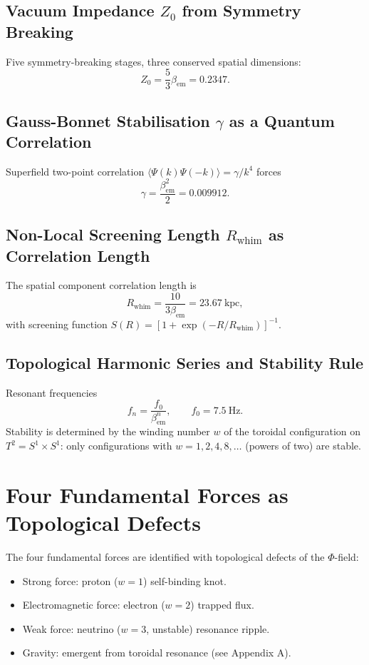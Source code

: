 \documentclass[12pt, a4paper]{article}
\begin{document}
\subsection{Vacuum Impedance $Z_{0}$ from Symmetry Breaking}
Five symmetry-breaking stages, three conserved spatial dimensions:
\begin{equation}
Z_{0} = \frac{5}{3}\beta_{\mathrm{em}} = 0.2347.
\end{equation}

\subsection{Gauss-Bonnet Stabilisation $\gamma$ as a Quantum Correlation}
Superfield two-point correlation $\langle \Psi (k)\Psi (- k)\rangle = \gamma /k^{4}$ forces
\begin{equation}
\gamma = \frac{\beta_{\mathrm{em}}^{2}}{2} = 0.009912.
\end{equation}

\subsection{Non-Local Screening Length $R_{\mathrm{whim}}$ as Correlation Length}
The spatial component correlation length is
\begin{equation}
R_{\mathrm{whim}} = \frac{10}{3\beta_{\mathrm{em}}} = 23.67\ \mathrm{kpc},
\end{equation}
with screening function $S(R) = [1 + \exp (- R / R_{\mathrm{whim}})]^{- 1}$.

\subsection{Topological Harmonic Series and Stability Rule}
Resonant frequencies
\begin{equation}
f_{n} = \frac{f_{0}}{\beta_{\mathrm{em}}^{n}},\qquad f_{0} = 7.5\ \mathrm{Hz}.
\end{equation}
Stability is determined by the winding number $w$ of the toroidal configuration on $T^{2} = S^{1}\times S^{1}$: only configurations with $w = 1,2,4,8,\ldots$ (powers of two) are stable.

\section{Four Fundamental Forces as Topological Defects}
\label{sec:forces}
The four fundamental forces are identified with topological defects of the $\Phi$-field:
\begin{itemize}
    \item Strong force: proton ($w=1$) self-binding knot.
    \item Electromagnetic force: electron ($w=2$) trapped flux.
    \item Weak force: neutrino ($w=3$, unstable) resonance ripple.
    \item Gravity: emergent from toroidal resonance (see Appendix A).
\end{itemize}
\end{document}
